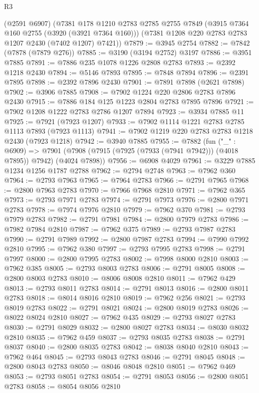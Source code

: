 \begin{lexlean}{R3}
\begin{coremodule}
    (@2591 @6907)
    (@7381
      @178
      @1210
      @2783
      @2785
      @2755
      @7849
      (@3915 @7364 @160 @2755 (@3920 (@3921 @7364 @160)))
      (@7381 @1208 @220 @2783 @2783 @1207 @2430 (@7402 @1207) @7421))
@7879 := @3945 @2754
@7882 := @7842 (@7878 (@7879 @276))
@7885 := @3190 (@3194 @2752) @3197
@7886 := @3951 @7885
@7891 := @7886 @235 @1078 @1226 @2808 @2783
@7893 := @2392 @1218 @2430
@7894 := @5146 @7893
@7895 := @7848 @7894
@7896 := @2391 @7895
@7898 := @2392 @7896 @2430
@7901 := @7891 @7898 (@2621 @7898)
@7902 := @3906 @7885
@7908 := @7902 @1224 @220 @2806 @2783 @7896 @2430
@7915 := @7886 @184 @125 @1223 @2804 @2783 @7895 @7896
@7921 := @7902 @1208 @1222 @2783 @2786 @1207 @7894
@7923 := @3934 @7885 @11
@7925 := @7921 (@7923 @1207)
@7933 := @7902 @1114 @1221 @2783 @2785 @1113 @7893 (@7923 @1113)
@7941 := @7902 @1219 @220 @2783 @2783 @1218 @2430 (@7923 @1218)
@7942 := @3940 @7885
@7955 := @7882
    (fun ("_" : @6909) =>
    @7901 (@7908 (@7915 (@7925 (@7933 (@7941 @7942))) (@4018 @7895)) @7942) (@4024 @7898))
@7956 := @6908 @4029
@7961 := @3229 @7885 @1234 @1256 @1787 @2788
@7962 := @2794 @2748
@7963 := @7962 @360
@7964 := @2793 @7963
@7965 := @7964 @2783
@7966 := @2791 @7965
@7968 := @2800 @7963 @2783
@7970 := @7966 @7968 @2810
@7971 := @7962 @365
@7973 := @2793 @7971 @2783
@7974 := @2791 @7973
@7976 := @2800 @7971 @2783
@7978 := @7974 @7976 @2810
@7979 := @7962 @370
@7981 := @2793 @7979 @2783
@7982 := @2791 @7981
@7984 := @2800 @7979 @2783
@7986 := @7982 @7984 @2810
@7987 := @7962 @375
@7989 := @2793 @7987 @2783
@7990 := @2791 @7989
@7992 := @2800 @7987 @2783
@7994 := @7990 @7992 @2810
@7995 := @7962 @380
@7997 := @2793 @7995 @2783
@7998 := @2791 @7997
@8000 := @2800 @7995 @2783
@8002 := @7998 @8000 @2810
@8003 := @7962 @385
@8005 := @2793 @8003 @2783
@8006 := @2791 @8005
@8008 := @2800 @8003 @2783
@8010 := @8006 @8008 @2810
@8011 := @7962 @429
@8013 := @2793 @8011 @2783
@8014 := @2791 @8013
@8016 := @2800 @8011 @2783
@8018 := @8014 @8016 @2810
@8019 := @7962 @256
@8021 := @2793 @8019 @2783
@8022 := @2791 @8021
@8024 := @2800 @8019 @2783
@8026 := @8022 @8024 @2810
@8027 := @7962 @435
@8029 := @2793 @8027 @2783
@8030 := @2791 @8029
@8032 := @2800 @8027 @2783
@8034 := @8030 @8032 @2810
@8035 := @7962 @459
@8037 := @2793 @8035 @2783
@8038 := @2791 @8037
@8040 := @2800 @8035 @2783
@8042 := @8038 @8040 @2810
@8043 := @7962 @464
@8045 := @2793 @8043 @2783
@8046 := @2791 @8045
@8048 := @2800 @8043 @2783
@8050 := @8046 @8048 @2810
@8051 := @7962 @469
@8053 := @2793 @8051 @2783
@8054 := @2791 @8053
@8056 := @2800 @8051 @2783
@8058 := @8054 @8056 @2810

\end{coremodule}
\end{lexlean}
